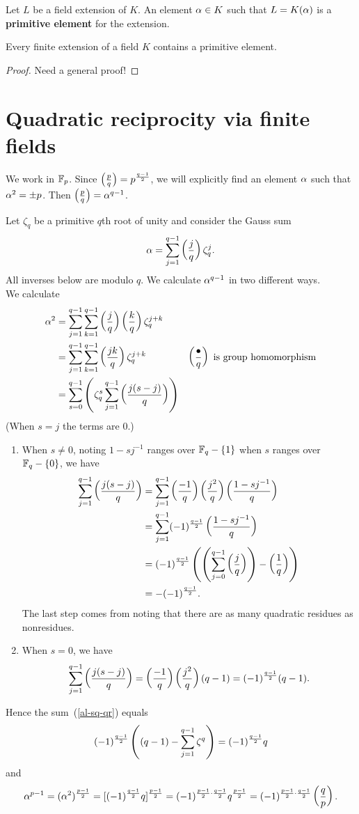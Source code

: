 \begin{df}
Let $L$ be a field extension of $K$. An element $\alpha\in K$ such that $L=K(\alpha)$ is a \textbf{primitive element} for the extension.
\end{df}
\begin{thm}
Every finite extension of a field $K$ contains a primitive element.
\end{thm}
\begin{proof}
Need a general proof!
\end{proof}

\section{Quadratic reciprocity via finite fields}
We work in $\mathbb{F}_p$.
Since $\left( {\frac{p}{q}} \right)= p^{\frac{q-1}2}$, we will explicitly find an element $\alpha$ such that $\alpha^2=\pm p$. Then $\left( {\frac{p}{q}} \right)=\alpha^{q-1}$.

Let $\zeta_q$ be a primitive $q$th root of unity and consider the Gauss sum
\[
\alpha=\sum_{j=1}^{q-1} \left( {\frac{j}{q}} \right)\zeta_q^j.
\]
All inverses below are modulo $q$. We calculate $\alpha^{q-1}$ in two different ways.\\

 We calculate
\begin{align}
\nonumber
\alpha^2 &= \sum_{j=1}^{q-1} \sum_{k=1}^{q-1}\left( {\frac{j}{q}} \right)\left( {\frac{k}{q}} \right)\zeta_q^{j+k}\\
\nonumber
&= \sum_{j=1}^{q-1} \sum_{k=1}^{q-1}\left( {\frac{jk}{q}} \right)\zeta_q^{j+k}&\left( {\frac{\bullet}{q}} \right)\text{ is group homomorphism}\\
&= \sum_{s=0}^{q-1}\left( { \zeta_q^s \sum_{j=1}^{q-1} \left( {\frac{j(s-j)}{q}} \right)} \right)\label{al-sq-qr}
\end{align}
(When $s=j$ the terms are 0.) 
\begin{enumerate}
\item When $s\ne 0$, noting $1-sj^{-1}$ ranges over $\mathbb{F}_q-\{1\}$ when $s$ ranges over $\mathbb{F}_q-\{0\}$, we have
\begin{align*}
\sum_{j=1}^{q-1} \left( {\frac{j(s-j)}{q}} \right)&=\sum_{j=1}^{q-1} \left( {\frac{-1}{q}} \right)\left( {\frac{j^2}{q}} \right)\left( {\frac{1-sj^{-1}}{q}} \right)\\
&=\sum_{j=1}^{q-1} (-1)^{\frac{q-1}2} \left( {\frac{1-sj^{-1}}{q}} \right)\\
&=(-1)^{\frac{q-1}2} \left( {\left( {\sum_{j=0}^{q-1} \left( {\frac{j}{q}} \right)} \right)-\left( {\frac{1}{q}} \right)} \right)\\
&=-(-1)^{\frac{q-1}2}.
\end{align*}
The last step comes from noting that there are as many quadratic residues as nonresidues.
\item When $s=0$, we have 
\[
\sum_{j=1}^{q-1} \left( {\frac{j(s-j)}{q}} \right)=\left( {\frac{-1}{q}} \right)\left( {\frac{j^2}{q}} \right)(q-1)=(-1)^{\frac{q-1}2}(q-1).
\]
\end{enumerate}
Hence the sum~(\ref{al-sq-qr}) equals
\[
(-1)^{\frac{q-1}2}\left( {(q-1)-\sum_{j=1}^{q-1}\zeta^q} \right)
=(-1)^{\frac{q-1}2}q
\]
and
\[
\alpha^{p-1}=(\alpha^2)^{\frac{p-1}2} =[(-1)^{\frac{q-1}2}q ]^{\frac{p-1}2}=(-1)^{\frac{p-1}2\cdot \frac{q-1}2}q^{\frac{p-1}2}=(-1)^{\frac{p-1}2\cdot \frac{q-1}2}\left( {\frac{q}{p}} \right).
\]


